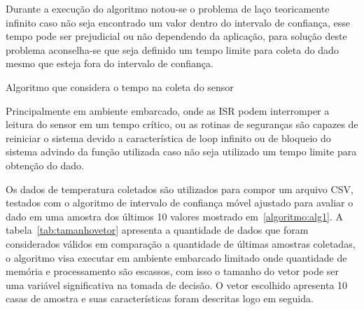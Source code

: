 Durante a execução do algoritmo notou-se o problema de laço teoricamente infinito caso não seja encontrado um valor dentro do intervalo de confiança, esse tempo pode ser prejudicial ou não dependendo da aplicação, para solução deste problema aconselha-se que seja definido um tempo limite para coleta do dado mesmo que esteja fora do intervalo de confiança. 

\begin{algorithm}[H]
    \caption{Algoritmo que considera o tempo na coleta do sensor}
    \label{algoritmo:alg_com_temp}
\end{algorithm}

Principalmente em ambiente embarcado, onde as ISR podem interromper a leitura do sensor em um tempo crítico, ou as rotinas de seguranças são capazes de reiniciar o sistema devido a característica de loop infinito ou de bloqueio do sistema advindo da função utilizada caso não seja utilizado um tempo limite para obtenção do dado.

Os dados de temperatura coletados são utilizados para compor um arquivo CSV, testados com o algoritmo de intervalo de confiança móvel ajustado para avaliar o dado em uma amostra dos últimos 10 valores mostrado em~\ref{algoritmo:alg1}.
A tabela~\ref{tab:tamanhovetor} apresenta a quantidade de dados que foram considerados válidos em comparação a quantidade de últimas amostras coletadas, o algoritmo visa executar em ambiente embarcado limitado onde quantidade de memória e processamento são escassos, com isso o tamanho do vetor pode ser uma variável significativa na tomada de decisão. O vetor escolhido apresenta 10 casas de amostra e suas características foram descritas logo em seguida.

